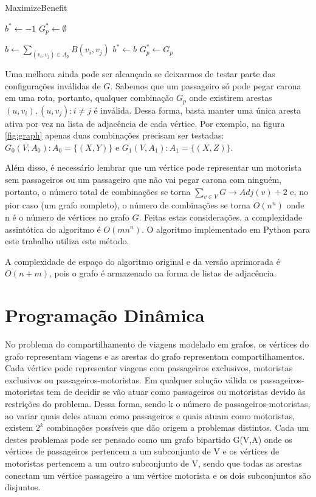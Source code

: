 \documentclass{article}
\begin{document}
\begin{algorithm}
\caption{MaximizeBenefit}\label{euclid}
\begin{algorithmic}[1]

\State $ b^* \gets -1 $
\State $ G_p^* \gets \emptyset $
\item {}

  \State $ \textit{b} \gets \sum_{(v_i, v_j) \in A_p} B(v_i, v_j) $
    \State $ b^* \gets b $
    \State $ G_p^* \gets G_p $
  \EndIf
\EndIf
\EndFor
\EndProcedure
\end{algorithmic}
\label{alg:alg_1}
\end{algorithm}

Uma melhora ainda pode ser alcançada se deixarmos de testar parte das configurações inválidas de $ G $. Sabemos que 
um passageiro só pode pegar carona em uma rota, portanto, qualquer combinação $ G_p $ onde existirem arestas $ (u, v_i), (u, v_j) : i \neq j $
é inválida. Dessa forma, basta manter uma única aresta ativa por vez na lista de adjacência de cada vértice. Por exemplo, na figura \ref{fig:graph} apenas 
duas combinações precisam ser testadas: $ G_0(V,A_0) : A_0 = \{(X,Y)\} $ e $ G_1(V,A_1) : A_1 = \{(X,Z)\} $.

Além disso, é necessário lembrar que um vértice pode representar um motorista sem passageiros ou um passageiro que não vai pegar carona com ninguém, 
portanto, o número total de combinações 
se torna $ \sum_{v \in V} G \rightarrow Adj(v) + 2 $ e, no pior caso (um grafo completo), o número de combinações se torna $ O(n^n) $ 
onde n é o número de vértices no grafo $ G $. Feitas estas considerações, a complexidade assintótica do algoritmo é $ O(mn^n) $.
O algoritmo implementado em Python para este trabalho utiliza este método.

A complexidade de espaço do algoritmo original e da versão aprimorada é $ O(n + m) $, pois o grafo é armazenado na forma de listas de adjacência.

\section{Programação Dinâmica}

No problema do compartilhamento de viagens modelado em grafos, os vértices do grafo representam viagens e as arestas do grafo representam 
compartilhamentos. Cada vértice pode representar viagens com passageiros exclusivos, motoristas exclusivos 
ou passageiros-motoristas. Em qualquer solução válida os passageiros-motoristas tem de decidir se vão
atuar como passageiros ou motoristas devido às restrições do problema. Dessa forma, sendo k o número de passageiros-motoristas, 
ao variar quais deles atuam como passageiros e quais atuam como motoristas, existem $ 2^k $ combinações possíveis que dão origem a problemas distintos. 
Cada um destes problemas pode ser pensado como um grafo bipartido G(V,A) onde os vértices de passageiros pertencem a um subconjunto de V e os vértices 
de motoristas pertencem a um outro subconjunto de V, sendo que todas as arestas conectam um vértice passageiro a um vértice motorista e os dois subconjuntos
são disjuntos.
\end{document}
